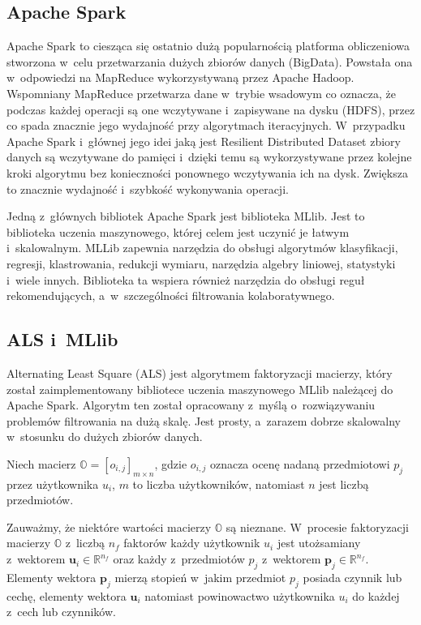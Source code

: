 \documentclass[12pt,a4paper]{report}
\newcommand{\setR}{\mathbb{R}}
\begin{document}
\subsection{Apache Spark}
Apache Spark to ciesząca się ostatnio dużą popularnością platforma obliczeniowa stworzona w~celu przetwarzania dużych zbiorów danych (BigData). Powstała ona w~odpowiedzi na MapReduce wykorzystywaną przez Apache Hadoop. Wspomniany MapReduce przetwarza dane w~trybie wsadowym co oznacza, że podczas każdej operacji są one wczytywane i~zapisywane na dysku (HDFS), przez co spada znacznie jego wydajność przy algorytmach iteracyjnych. W~przypadku Apache Spark i~głównej jego idei jaką jest 
Resilient Distributed Dataset zbiory danych są wczytywane do pamięci i~dzięki temu są wykorzystywane przez kolejne kroki algorytmu bez konieczności ponownego wczytywania ich na dysk. Zwiększa to znacznie wydajność i~szybkość wykonywania operacji.

Jedną z~głównych bibliotek Apache Spark jest biblioteka MLlib. Jest to biblioteka uczenia maszynowego, której celem jest uczynić je łatwym i~skalowalnym. MLLib zapewnia narzędzia do obsługi algorytmów klasyfikacji, regresji, klastrowania, redukcji wymiaru, narzędzia algebry liniowej, statystyki i~wiele innych. Biblioteka ta wspiera również narzędzia do obsługi reguł rekomendujących, a~w~szczególności filtrowania kolaboratywnego.

\subsection{ALS i~MLlib}
Alternating Least Square (ALS) jest algorytmem faktoryzacji macierzy, który został zaimplementowany bibliotece uczenia maszynowego MLlib należącej do Apache Spark. Algorytm ten został opracowany z~myślą o~rozwiązywaniu problemów filtrowania na dużą skalę. Jest prosty, a~zarazem dobrze skalowalny w~stosunku do dużych zbiorów danych.

Niech macierz $\mathbb{O}=[o_{i,j}]_{m \times n}$, gdzie $o_{i,j}$ oznacza ocenę nadaną przedmiotowi $p_j$ przez użytkownika $u_i$, $m$ to liczba użytkowników, natomiast $n$ jest liczbą przedmiotów.

Zauważmy, że niektóre wartości macierzy $\mathbb{O}$ są nieznane. W~procesie faktoryzacji macierzy $\mathbb{O}$ z~liczbą $n_f$ faktorów każdy użytkownik $u_i$ jest utożsamiany z~wektorem $\mathbf{u}_i \in \setR^{n_f}$ oraz każdy z~przedmiotów $p_j$ z~wektorem $\mathbf{p}_j \in \setR^{n_f}$. Elementy wektora $\mathbf{p}_j$ mierzą stopień w~jakim przedmiot $p_j$ posiada czynnik lub cechę, elementy wektora $\mathbf{u}_i$ natomiast powinowactwo użytkownika $u_i$ do każdej z~cech lub czynników.
\end{document}
